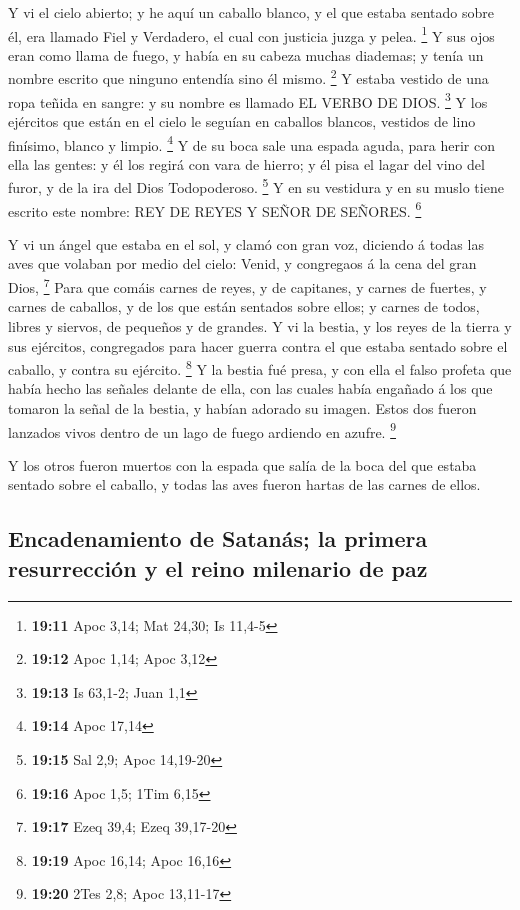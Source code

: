  Y vi el cielo abierto; y he aquí un caballo blanco, y el
que estaba sentado sobre él, era llamado Fiel y Verdadero, el cual con
justicia juzga y pelea. \footnote{\textbf{19:11} Apoc 3,14; Mat 24,30;
  Is 11,4-5}  Y sus ojos eran como llama de fuego, y había
en su cabeza muchas diademas; y tenía un nombre escrito que ninguno
entendía sino él mismo. \footnote{\textbf{19:12} Apoc 1,14; Apoc 3,12}
 Y estaba vestido de una ropa teñida en sangre: y su nombre
es llamado EL VERBO DE DIOS. \footnote{\textbf{19:13} Is 63,1-2; Juan
  1,1}  Y los ejércitos que están en el cielo le seguían en
caballos blancos, vestidos de lino finísimo, blanco y limpio.
\footnote{\textbf{19:14} Apoc 17,14}  Y de su boca sale una
espada aguda, para herir con ella las gentes: y él los regirá con vara
de hierro; y él pisa el lagar del vino del furor, y de la ira del Dios
Todopoderoso. \footnote{\textbf{19:15} Sal 2,9; Apoc 14,19-20}
 Y en su vestidura y en su muslo tiene escrito este nombre:
REY DE REYES Y SEÑOR DE SEÑORES. \footnote{\textbf{19:16} Apoc 1,5; 1Tim
  6,15}

 Y vi un ángel que estaba en el sol, y clamó con gran voz,
diciendo á todas las aves que volaban por medio del cielo: Venid, y
congregaos á la cena del gran Dios, \footnote{\textbf{19:17} Ezeq 39,4;
  Ezeq 39,17-20}  Para que comáis carnes de reyes, y de
capitanes, y carnes de fuertes, y carnes de caballos, y de los que están
sentados sobre ellos; y carnes de todos, libres y siervos, de pequeños y
de grandes.  Y vi la bestia, y los reyes de la tierra y sus
ejércitos, congregados para hacer guerra contra el que estaba sentado
sobre el caballo, y contra su ejército. \footnote{\textbf{19:19} Apoc
  16,14; Apoc 16,16}  Y la bestia fué presa, y con ella el
falso profeta que había hecho las señales delante de ella, con las
cuales había engañado á los que tomaron la señal de la bestia, y habían
adorado su imagen. Estos dos fueron lanzados vivos dentro de un lago de
fuego ardiendo en azufre. \footnote{\textbf{19:20} 2Tes 2,8; Apoc
  13,11-17}

 Y los otros fueron muertos con la espada que salía de la
boca del que estaba sentado sobre el caballo, y todas las aves fueron
hartas de las carnes de ellos.

\hypertarget{encadenamiento-de-satanuxe1s-la-primera-resurrecciuxf3n-y-el-reino-milenario-de-paz}{%
\subsection{Encadenamiento de Satanás; la primera resurrección y el
reino milenario de
paz}\label{encadenamiento-de-satanuxe1s-la-primera-resurrecciuxf3n-y-el-reino-milenario-de-paz}}

